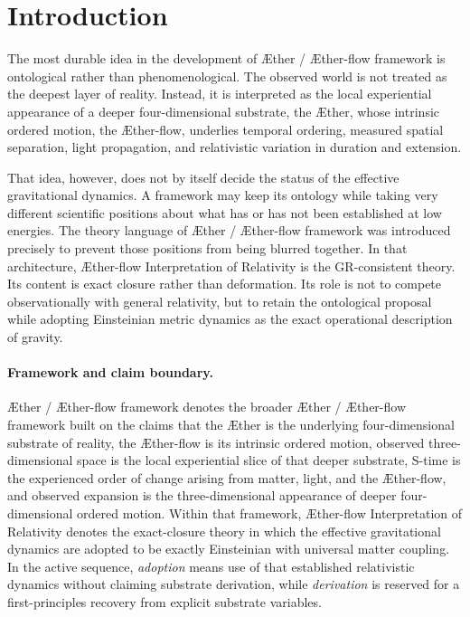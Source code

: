 \documentclass[11pt]{article}
\newcommand{\Aether}{\AE{}ther}
\newcommand{\Aflow}{\AE{}ther-flow}
\newcommand{\TheoryName}{\Aflow{} Interpretation of Relativity}
\newcommand{\TheoryProgram}{\Aether{} / \Aflow{} framework}
\begin{document}
\section{Introduction}

The most durable idea in the development of \TheoryProgram{} is ontological rather than phenomenological. The observed world is not treated as the deepest layer of reality. Instead, it is interpreted as the local experiential appearance of a deeper four-dimensional substrate, the \Aether{}, whose intrinsic ordered motion, the \Aflow{}, underlies temporal ordering, measured spatial separation, light propagation, and relativistic variation in duration and extension.

That idea, however, does not by itself decide the status of the effective gravitational dynamics. A framework may keep its ontology while taking very different scientific positions about what has or has not been established at low energies. The theory language of \TheoryProgram{} was introduced precisely to prevent those positions from being blurred together. In that architecture, \TheoryName{} is the GR-consistent theory. Its content is exact closure rather than deformation. Its role is not to compete observationally with general relativity, but to retain the ontological proposal while adopting Einsteinian metric dynamics as the exact operational description of gravity.

\paragraph{Framework and claim boundary.}
\TheoryProgram{} denotes the broader \Aether{} / \Aflow{} framework built on the claims that the \Aether{} is the underlying four-dimensional substrate of reality, the \Aflow{} is its intrinsic ordered motion, observed three-dimensional space is the local experiential slice of that deeper substrate, S-time is the experienced order of change arising from matter, light, and the \Aflow{}, and observed expansion is the three-dimensional appearance of deeper four-dimensional ordered motion. Within that framework, \TheoryName{} denotes the exact-closure theory in which the effective gravitational dynamics are adopted to be exactly Einsteinian with universal matter coupling. In the active sequence, \emph{adoption} means use of that established relativistic dynamics without claiming substrate derivation, while \emph{derivation} is reserved for a first-principles recovery from explicit substrate variables.
\end{document}

